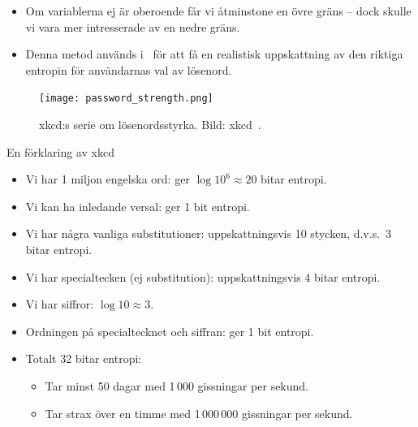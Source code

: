 \documentclass{beamer}
\theoremstyle{definition}
\begin{document}
\begin{frame}{\insertsubsectionhead}
  \begin{itemize}
    \item Om variablerna ej är oberoende får vi åtminstone en övre gräns -- 
      dock skulle vi vara mer intresserade av en nedre gräns.

    \item Denna metod används i~\cite{Komanduri2011opa} för att få en 
      realistisk uppskattning av den riktiga entropin för användarnas val av 
      lösenord.

  \end{itemize}
\end{frame}

\begin{frame}{\insertsubsectionhead}
  \begin{figure}
    \texttt{[image: password\_strength.png]}
    \caption{xkcd:s serie om lösenordsstyrka.
    Bild: xkcd~\cite{xkcd936}.}
  \end{figure}
\end{frame}

\begin{frame}{\insertsubsectionhead}{En förklaring av xkcd}
  \begin{itemize}
    \item Vi har 1 miljon engelska ord: ger \(\log 10^6 \approx 20\) bitar 
      entropi.

    \item Vi kan ha inledande versal: ger 1 bit entropi.

    \item Vi har några vanliga substitutioner: uppskattningsvis 10 stycken, 
      d.v.s.~3 bitar entropi.

    \item Vi har specialtecken (ej substitution): uppskattningsvis 4 bitar 
      entropi.

    \item Vi har siffror: \(\log 10\approx 3\).

    \item Ordningen på specialtecknet och siffran: ger 1 bit entropi.

    \item Totalt 32 bitar entropi:
      \begin{itemize}
        \item Tar minst 50 dagar med 1\,000 gissningar per sekund.
        \item Tar strax över en timme med 1\,000\,000 gissningar per sekund.
      \end{itemize}

  \end{itemize}
\end{frame}
\end{document}
